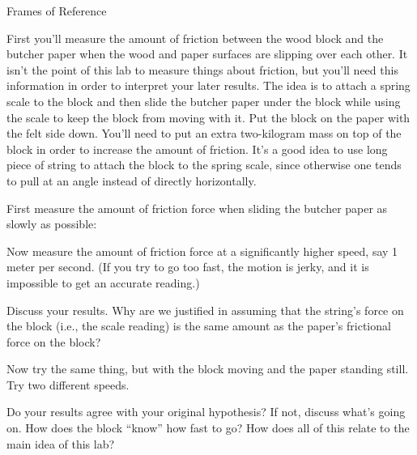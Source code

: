 \begin{lab}{Frames of Reference}
\onelineforwriting


First you'll measure the amount of friction between the wood block and the
butcher paper when the wood and paper surfaces are slipping over each other.
It isn't the point of this lab to measure things about friction, but you'll need this
information in order to interpret your later results.
The idea is to attach a spring scale to the block and then slide the butcher paper
under the block while using the scale to keep the block from moving with it.
Put the block on the paper with the felt side down.
You'll need to
 put an extra two-kilogram mass on top of the block in order to increase the amount of friction.
It's a good idea to use long piece of string to attach the block to the spring scale, since
 otherwise one tends to pull at an angle instead of directly horizontally.

First measure the amount of friction force when sliding the butcher paper as slowly as possible: \smallspaceforwriting

Now measure the amount of friction force at a significantly higher speed, say 1
meter per second. (If you try to go too fast, the motion is jerky, and it is impossible to get an accurate
 reading.) \smallspaceforwriting

Discuss your results. Why are we justified in assuming that the string's force on the block (i.e., the scale
reading) is the same amount as the paper's frictional force on the block?


Now try the same thing, but with the block moving and the paper standing still. Try two different
speeds.

Do your results agree with your original hypothesis? If not, discuss what's going on. How does the
block ``know'' how fast to go? How does all of this relate to the main idea of this lab?

\end{lab}
\newcommand{\fillinblank}{\_\_\_\_\_\_}
